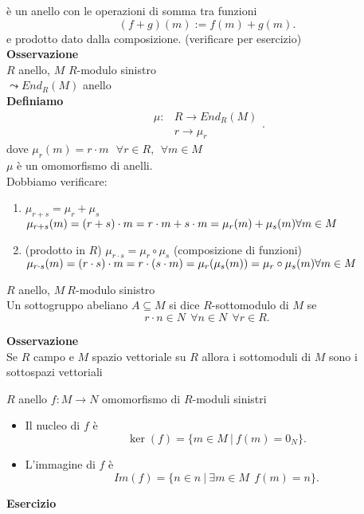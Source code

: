 \documentclass[12px]{article}
\begin{document}
 è un anello con le operazioni di somma tra funzioni
 \[
	 (f + g)(m) := f(m) + g(m)
 .\] 
 e prodotto dato dalla composizione. (verificare per esercizio)\\
 \textbf{Osservazione}\\
 $R$ anello, $M$ $R$-modulo sinistro\\
 $\leadsto End_R(M)$ anello\\
 \textbf{Definiamo}
 \[
	 \begin{aligned}
		 \mu: &R \rightarrow End_R(M)\\
		      &r \rightarrow \mu_r
	 \end{aligned}
 .\]
 dove $\mu_r(m) = r\cdot m \ \ \ \forall r\in R, \ \ \forall m\in M$\\
  $\mu$ è un omomorfismo di anelli.\\
  Dobbiamo verificare:
  \begin{enumerate}
	  \item $\mu_{r+s} = \mu_r + \mu_s$\\
		  $\mu_{r+s}(m) = (r+s)\cdot m = r\cdot m + s\cdot m = \mu_r(m) + \mu_s(m)\hfill \forall m\in M$ 
	  \item  (prodotto in $R$) $\mu_{r\cdot s} = \mu_r\circ\mu_s$ (composizione di funzioni)\\
		  $\mu_{r\cdot s}(m) = (r\cdot s)\cdot m = r\cdot (s\cdot m) = \mu_r(\mu_s(m)) = \mu_r\circ\mu_s(m) \hfill \forall m\in M$
  \end{enumerate}
  \begin{defi}
  	$R$ anello, $M\ R$-modulo sinistro\\
	Un sottogruppo abeliano  $A\subseteq M$ si dice  $R$-sottomodulo di $M$ se 
	 \[
		 r\cdot n \in N \ \ \forall n\in N \ \ \forall r\in R
	.\] 
  \end{defi}
  \textbf{Osservazione }\\
  Se $R$ campo e $M$ spazio vettoriale su $R$ allora i sottomoduli di $M$ sono i sottospazi vettoriali
  \begin{defi}
  	$R$ anello $f: M \rightarrow N$ omomorfismo di $R$-moduli sinistri
	\begin{itemize}
		\item Il nucleo di  $f$ è 
			\[
				\ker(f) = \{m\in M\ | \ f(m) = 0_N\}
			.\] 
		\item L'immagine di  $f$ è 
			\[
				Im(f) = \{ n\in n\ | \ \exists m\in M \ \ f(m) = n\}
			.\] 
	\end{itemize}
  \end{defi}
  \textbf{Esercizio}\\
\end{document}
